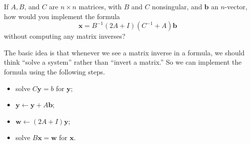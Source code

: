 \begin{pro}
  If $A, B$, and $C$ are $n\times n$ matrices,
  with $B$ and $C$ nonsingular,
  and $\mathbf{b}$ an $n$-vector,
  how would you implement the formula
  \begin{displaymath}
    \mathbf{x} = B^{-1}(2A+I)(C^{-1}+A)\mathbf{b}
  \end{displaymath}
  without computing any matrix inverses?
\end{pro}

\begin{sol}
  The basic idea is that whenever we see a matrix inverse
  in a formula, we should think ``solve a system'' rather than
  ``invert a matrix.'' So we can implement the formula using the following steps.
  \begin{itemize}
  \item
    solve $C\mathbf{y} = b$ for $\mathbf{y}$;
  \item
    $\mathbf{y}\leftarrow \mathbf{y} + A\mathbf{b}$;
  \item
    $\mathbf{w} \leftarrow (2A+I)\mathbf{y}$;
  \item
    solve $B\mathbf{x} = \mathbf{w}$ for $\mathbf{x}$.
  \end{itemize}
\end{sol}
